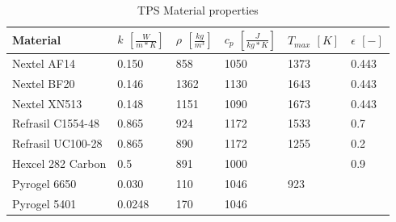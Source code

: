 \begin{table}[H]
\caption {TPS Material properties}
\centering
    \begin{tabular}{|l|l|l|l|l|l|}
    \hline
    \textbf{Material}         & \textbf{ $ k $ $ [ \frac{W}{m*K} ] $} & \textbf{ $ \rho $ $ [ \frac{kg}{m^3} ] $} & \textbf{  $ c_{p} $ $ [ \frac{J}{kg*K} ] $ }& \textbf{ $ T_{max} $ $ [ K ] $} &\textbf{ $ \epsilon $ $ [ - ] $} \\[1.5ex] \hline \hline
    Nextel AF14       & 0.150                                                 & 858                                        & 1050                                            & 1373	 & 0.443                                      \\ \hline
    Nextel BF20       & 0.146 
& 1362                                        & 1130 
& 1643	 & 0.443                                      
 \\ \hline
    Nextel XN513      & 0.148                                                 & 1151                                       & 1090                                            & 1673	 & 0.443                                      \\ \hline
    Refrasil C1554-48 & 0.865                                                 & 924                                        & 1172                                            & 1533	 & 0.7                                        \\ \hline
    Refrasil UC100-28 & 0.865                                                 & 890                                        & 1172                                            & 1255  & 0.2                                        \\ \hline
    Hexcel 282 Carbon & 0.5                                                   & 891                                        & 1000                                            & ~ 	 & 0.9                                        \\ \hline
    Pyrogel 6650      & 0.030                                                 & 110                                        & 1046                                            & 923    & ~                                          \\ \hline
    Pyrogel 5401      & 0.0248                                                & 170                                        & 1046                                            & ~  	 & ~                                          \\ \hline

\end{tabular}
\end{table}
